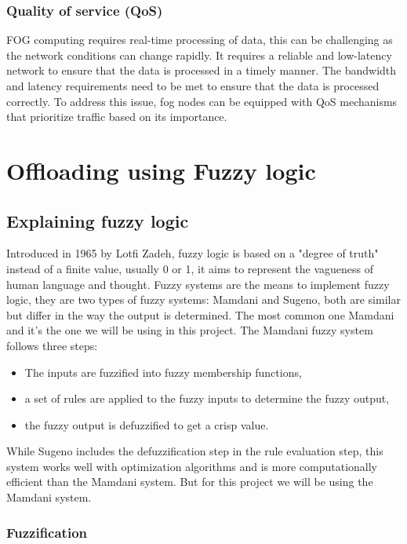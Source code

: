 \subsection{Quality of service (QoS)}

FOG computing requires real-time processing of data, this can be challenging as the network conditions can change rapidly.
It requires a reliable and low-latency network to ensure that the data is processed in a timely manner. The bandwidth
and latency requirements need to be met to ensure that the data is processed correctly. To address this issue, fog nodes
can be equipped with QoS mechanisms that prioritize traffic based on its importance.

\chapter{Offloading using Fuzzy logic}
\label{chap:fuzzy}

\section{Explaining fuzzy logic}
\label{sec:fuzzy-explanation}

Introduced in 1965 by Lotfi Zadeh,\cite{zadeh-1965} fuzzy logic is based on a "degree of truth" instead of a finite
value, usually 0 or 1, it aims to represent the vagueness of human language and thought. Fuzzy systems are the means
to implement fuzzy logic, they are two types of fuzzy systems: Mamdani and Sugeno, both are similar but differ in the
way the output is determined. The most common one Mamdani and it's the one we will be using in this project. The
Mamdani fuzzy system follows three steps:

\begin{itemize}
	\item The inputs are fuzzified into fuzzy membership functions,
	\item a set of rules are applied to the fuzzy inputs to determine the fuzzy output,
	\item the fuzzy output is defuzzified to get a crisp value.
\end{itemize}

While Sugeno includes the defuzzification step in the rule evaluation step, this system works well with optimization
algorithms and is more computationally efficient than the Mamdani system. But for this project we will be using the
Mamdani system.

\subsection{Fuzzification}
\label{subsec:fuzzy-fuzzification}

